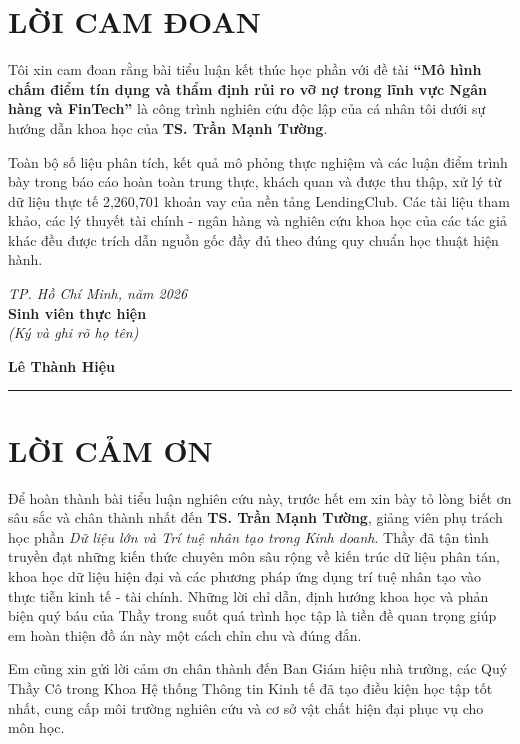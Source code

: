 \documentclass[
  13pt,
  a4paper,
]{report}
\begin{document}
\section{LỜI CAM ĐOAN}\label{lux1eddi-cam-ux111oan}

Tôi xin cam đoan rằng bài tiểu luận kết thúc học phần với đề tài
\textbf{``Mô hình chấm điểm tín dụng và thẩm định rủi ro vỡ nợ trong
lĩnh vực Ngân hàng và FinTech''} là công trình nghiên cứu độc lập của cá
nhân tôi dưới sự hướng dẫn khoa học của \textbf{TS. Trần Mạnh Tường}.

Toàn bộ số liệu phân tích, kết quả mô phỏng thực nghiệm và các luận điểm
trình bày trong báo cáo hoàn toàn trung thực, khách quan và được thu
thập, xử lý từ dữ liệu thực tế 2,260,701 khoản vay của nền tảng
LendingClub. Các tài liệu tham khảo, các lý thuyết tài chính - ngân hàng
và nghiên cứu khoa học của các tác giả khác đều được trích dẫn nguồn gốc
đầy đủ theo đúng quy chuẩn học thuật hiện hành.

\emph{TP. Hồ Chí Minh, năm 2026}\\
\textbf{Sinh viên thực hiện}\\
\emph{(Ký và ghi rõ họ tên)}

\textbf{Lê Thành Hiệu}

\newpage

\begin{center}\rule{0.5\linewidth}{0.5pt}\end{center}

\section{LỜI CẢM ƠN}\label{lux1eddi-cux1ea3m-ux1a1n}

Để hoàn thành bài tiểu luận nghiên cứu này, trước hết em xin bày tỏ lòng
biết ơn sâu sắc và chân thành nhất đến \textbf{TS. Trần Mạnh Tường},
giảng viên phụ trách học phần \emph{Dữ liệu lớn và Trí tuệ nhân tạo
trong Kinh doanh}. Thầy đã tận tình truyền đạt những kiến thức chuyên
môn sâu rộng về kiến trúc dữ liệu phân tán, khoa học dữ liệu hiện đại và
các phương pháp ứng dụng trí tuệ nhân tạo vào thực tiễn kinh tế - tài
chính. Những lời chỉ dẫn, định hướng khoa học và phản biện quý báu của
Thầy trong suốt quá trình học tập là tiền đề quan trọng giúp em hoàn
thiện đồ án này một cách chỉn chu và đúng đắn.

Em cũng xin gửi lời cảm ơn chân thành đến Ban Giám hiệu nhà trường, các
Quý Thầy Cô trong Khoa Hệ thống Thông tin Kinh tế đã tạo điều kiện học
tập tốt nhất, cung cấp môi trường nghiên cứu và cơ sở vật chất hiện đại
phục vụ cho môn học.
\end{document}
